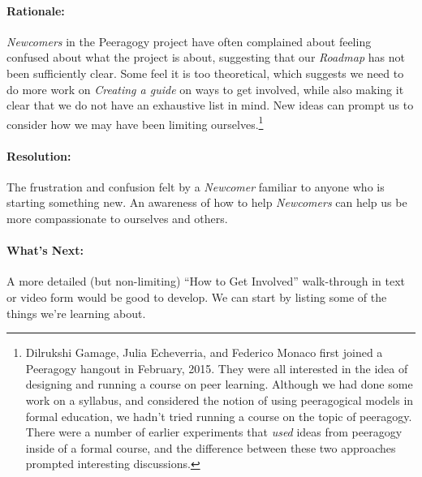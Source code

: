 \paragraph{Rationale:} \emph{Newcomers} in the Peeragogy project have often complained
about feeling confused about what the project is about, suggesting that our \emph{Roadmap}
has not been sufficiently clear.  Some feel it is too theoretical, which suggests
we need to do more work on \emph{Creating a guide} on ways to get involved, while also
making it clear that we do not have an exhaustive list in mind.  New ideas can prompt us to consider how we may have been limiting ourselves.\footnote{Dilrukshi Gamage, Julia Echeverria, and Federico Monaco first joined a Peeragogy hangout in February, 2015.  They were all interested in the idea of designing and running a course on peer learning.  Although we had done some work on a syllabus, and considered the notion of using peeragogical models in formal education, we hadn't tried running a course on the topic of peeragogy.  There were a number of earlier experiments that \emph{used} ideas from peeragogy inside of a formal course, and the difference between these two approaches prompted interesting discussions.}

\paragraph{Resolution:}
The frustration and confusion felt by a \emph{Newcomer} familiar to anyone who is starting something new.  An awareness of how to help \emph{Newcomers} can help us be more compassionate to ourselves and others.

\paragraph{What's Next:} A more detailed (but non-limiting) ``How to Get Involved'' walk-through in text or video form would be good to develop. We can start by listing some of the things we're learning about.
